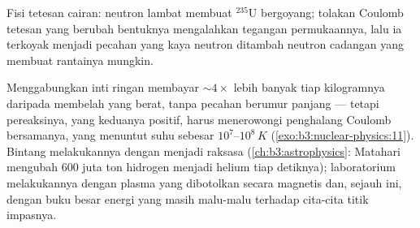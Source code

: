 \begin{omfigure}

{\small Fisi tetesan cairan: neutron lambat membuat $^{235}$U
bergoyang; tolakan Coulomb tetesan yang berubah bentuknya mengalahkan
tegangan permukaannya, lalu ia terkoyak menjadi pecahan yang kaya neutron
ditambah neutron cadangan yang membuat rantainya mungkin.}
\end{omfigure}

\begin{remark}\label{rem:b3:nuclear-physics:fusion}
Menggabungkan inti ringan membayar $\sim4\times$ lebih banyak tiap
kilogramnya daripada membelah yang berat, tanpa pecahan berumur panjang ---
tetapi pereaksinya, yang keduanya positif, harus menerowongi penghalang
Coulomb bersamanya, yang menuntut suhu sebesar $10^7$--$10^8\,\unit{K}$
(\cref{exo:b3:nuclear-physics:11}). Bintang melakukannya dengan menjadi raksasa
(\cref{ch:b3:astrophysics}: Matahari mengubah \qty{600}{} juta
ton hidrogen menjadi helium tiap detiknya); laboratorium melakukannya
dengan plasma yang dibotolkan secara magnetis dan, sejauh ini, dengan buku
besar energi yang masih malu-malu terhadap cita-cita titik impasnya.
\end{remark}

